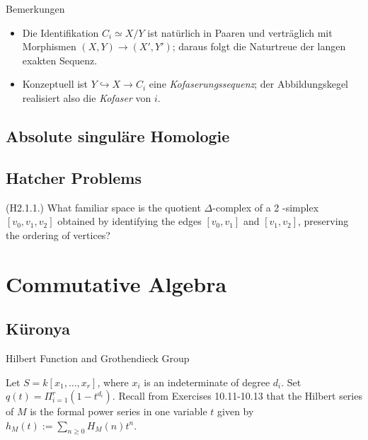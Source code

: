 \documentclass[10pt, letterpaper]{article}
\begin{document}
Bemerkungen
\begin{itemize}
  \item Die Identifikation $C_i\simeq X/Y$ ist natürlich in Paaren und verträglich mit Morphismen $(X,Y)\to (X',Y')$; daraus folgt die Naturtreue der langen exakten Sequenz.
  \item Konzeptuell ist $Y\hookrightarrow X\to C_i$ eine \emph{Kofaserungssequenz}; der Abbildungskegel realisiert also die \emph{Kofaser} von $i$.
\end{itemize}



\subsection{Absolute singuläre Homologie}







\pagebreak

\subsection{Hatcher Problems}




(H2.1.1.) What
 familiar space is the quotient $\Delta$-complex of a 2 -simplex $\left[v_0, v_1, v_2\right]$ obtained by identifying the edges $\left[v_0, v_1\right]$ and $\left[v_1, v_2\right]$, preserving the ordering of vertices?



\pagebreak


\section{Commutative Algebra}







\subsection{Küronya}

Hilbert Function and Grothendieck Group

Let $S=k\left[x_1, \ldots, x_r\right]$, where $x_i$ is an indeterminate of degree $d_i$. Set $q(t)=\Pi_{i=1}^r\left(1-t^{d_i}\right)$. Recall from Exercises 10.11-10.13 that the Hilbert series of $M$ is the formal power series in one variable $t$ given by $h_M(t):= \sum_{n \geq 0} H_M(n) t^n$.
\end{document}
